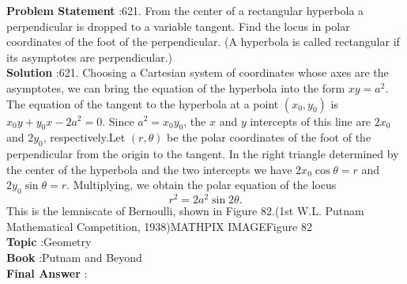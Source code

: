 \documentclass[10pt]{article}
\begin{document}
\textbf{Problem Statement} :621. From the center of a rectangular hyperbola a perpendicular is dropped to a variable tangent. Find the locus in polar coordinates of the foot of the perpendicular. (A hyperbola is called rectangular if its asymptotes are perpendicular.)\\
\textbf{Solution} :621. Choosing a Cartesian system of coordinates whose axes are the asymptotes, we can bring the equation of the hyperbola into the form $x y=a^{2}$. The equation of the tangent to the hyperbola at a point $\left(x_{0}, y_{0}\right)$ is $x_{0} y+y_{0} x-2 a^{2}=0$. Since $a^{2}=x_{0} y_{0}$, the $x$ and $y$ intercepts of this line are $2 x_{0}$ and $2 y_{0}$, respectively.Let $(r, \theta)$ be the polar coordinates of the foot of the perpendicular from the origin to the tangent. In the right triangle determined by the center of the hyperbola and the two intercepts we have $2 x_{0} \cos \theta=r$ and $2 y_{0} \sin \theta=r$. Multiplying, we obtain the polar equation of the locus$$ r^{2}=2 a^{2} \sin 2 \theta . $$This is the lemniscate of Bernoulli, shown in Figure 82.(1st W.L. Putnam Mathematical Competition, 1938)MATHPIX IMAGEFigure 82\\
\textbf{Topic} :Geometry\\
\textbf{Book} :Putnam and Beyond\\
\textbf{Final Answer} :\\
\end{document}

